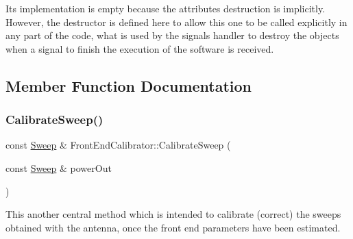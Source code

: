 Its implementation is empty because the attributes destruction is implicitly. However, the destructor is defined here to allow this one to be called explicitly in any part of the code, what is used by the signals handler to destroy the objects when a signal to finish the execution of the software is received. 

\subsection{Member Function Documentation}
\mbox{\label{classFrontEndCalibrator_afd5775502a0aa05976dccd6142ad46b0}} 
\subsubsection{\texorpdfstring{Calibrate\+Sweep()}{CalibrateSweep()}}
{\footnotesize\ttfamily const \hyperlink{structSweep}{Sweep} \& Front\+End\+Calibrator\+::\+Calibrate\+Sweep (\begin{DoxyParamCaption}\item[{const \hyperlink{structSweep}{Sweep} \&}]{power\+Out }\end{DoxyParamCaption})}



This another central method which is intended to calibrate (correct) the sweeps obtained with the antenna, once the front end parameters have been estimated. 

